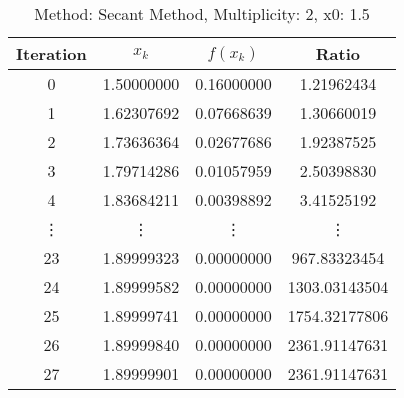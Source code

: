 \begin{table}
\centering
\caption{Method: Secant Method, Multiplicity: 2, x0: 1.5}
\label{tab:table_Secant_Method_2_1_5}
\begin{tabular}{c c c c}
\toprule
Iteration &      $x_k$ &   $f(x_k)$ &         Ratio \\
\midrule
        0 & 1.50000000 & 0.16000000 &    1.21962434 \\
        1 & 1.62307692 & 0.07668639 &    1.30660019 \\
        2 & 1.73636364 & 0.02677686 &    1.92387525 \\
        3 & 1.79714286 & 0.01057959 &    2.50398830 \\
        4 & 1.83684211 & 0.00398892 &    3.41525192 \\
   \vdots &     \vdots &     \vdots &        \vdots \\
       23 & 1.89999323 & 0.00000000 &  967.83323454 \\
       24 & 1.89999582 & 0.00000000 & 1303.03143504 \\
       25 & 1.89999741 & 0.00000000 & 1754.32177806 \\
       26 & 1.89999840 & 0.00000000 & 2361.91147631 \\
       27 & 1.89999901 & 0.00000000 & 2361.91147631 \\
\bottomrule
\end{tabular}
\end{table}

